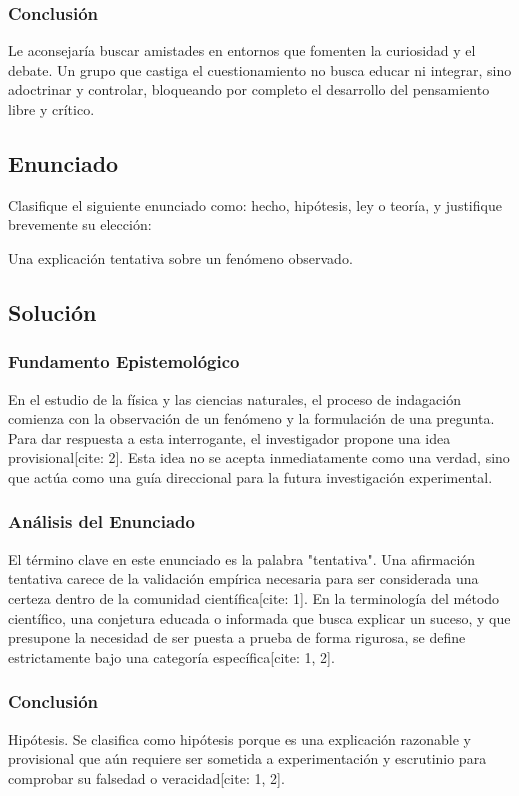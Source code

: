 \documentclass[12pt, a4paper]{article}
\begin{document}
\subsubsection*{Conclusión}
Le aconsejaría buscar amistades en entornos que fomenten la curiosidad y el debate. Un grupo que castiga el cuestionamiento no busca educar ni integrar, sino adoctrinar y controlar, bloqueando por completo el desarrollo del pensamiento libre y crítico.

\newpage

\subsection*{Enunciado}
Clasifique el siguiente enunciado como: hecho, hipótesis, ley o teoría, y justifique brevemente su elección: 

Una explicación tentativa sobre un fenómeno observado.

\subsection*{Solución}

\subsubsection*{Fundamento Epistemológico}
En el estudio de la física y las ciencias naturales, el proceso de indagación comienza con la observación de un fenómeno y la formulación de una pregunta. Para dar respuesta a esta interrogante, el investigador propone una idea provisional[cite: 2]. Esta idea no se acepta inmediatamente como una verdad, sino que actúa como una guía direccional para la futura investigación experimental.

\subsubsection*{Análisis del Enunciado}
El término clave en este enunciado es la palabra "tentativa". Una afirmación tentativa carece de la validación empírica necesaria para ser considerada una certeza dentro de la comunidad científica[cite: 1]. En la terminología del método científico, una conjetura educada o informada que busca explicar un suceso, y que presupone la necesidad de ser puesta a prueba de forma rigurosa, se define estrictamente bajo una categoría específica[cite: 1, 2].

\subsubsection*{Conclusión}
Hipótesis. Se clasifica como hipótesis porque es una explicación razonable y provisional que aún requiere ser sometida a experimentación y escrutinio para comprobar su falsedad o veracidad[cite: 1, 2].
\end{document}

